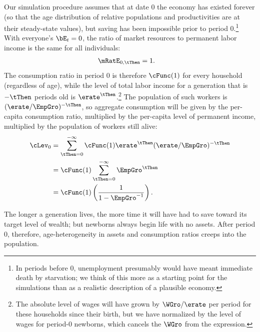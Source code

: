 \documentclass{handout}
\begin{document}
Our simulation procedure assumes that at date 0 the economy has existed forever (so 
that the age distribution of relative populations and productivities are at their steady-state values), but saving has been impossible prior to
period 0.\footnote{In periods before 0, unemployment presumably would have 
meant immediate death by starvation; we think of this more as a starting point
for the simulations than as a realistic description of a plausible economy.}
With everyone's $\bE_{t}=0$, the ratio of market resources to permanent
labor income is the same for all individuals:
\begin{equation}\begin{gathered}\begin{aligned}
  \mRatE_{0,\tThen} & =  1
.
\end{aligned}\end{gathered}\end{equation}
The consumption ratio in period 0 is therefore $\cFunc(1)$ for every
household (regardless of age), while the
level of total labor income for a generation that is $-\tThen$ periods old is $\erate^{\tThen}$.\footnote{The absolute level of wages will have
grown by $\WGro/\erate$ per period for these households since their birth, but we have normalized by the level of wages
for period-0 newborns, which cancels the $\WGro$ from the expression.}  The population of
such workers is $(\erate/\EmpGro)^{-\tThen}$, so aggregate consumption will
be given by the per-capita consumption ratio, multiplied by the
per-capita level of permanent income, multiplied by the population of
workers still alive:
\begin{equation}\begin{gathered}\begin{aligned}
  \cLev_{0} & =  \sum_{\tThen=0}^{-\infty} \cFunc(1) \erate^{\tThen} (\erate/\EmpGro)^{-\tThen}
\\ & =  \cFunc(1) \sum_{\tThen=0}^{-\infty}  \EmpGro^{\tThen}
\\ & =  \cFunc(1) \left(\frac{1}{1-\EmpGro^{-1}}\right)
.
\end{aligned}\end{gathered}\end{equation}

The longer a generation lives, the more time it will have had to save toward
its target level of wealth; but newborns always begin life with no assets.  After period 0, therefore, age-heterogeneity in assets and consumption ratios creeps into the population.
\end{document}

